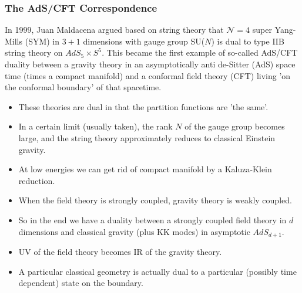 \documentclass[8pt,aspectratio=169]{beamer}
\begin{document}
\begin{frame}
\frametitle{The AdS/CFT Correspondence}

In 1999, Juan Maldacena argued based on string theory that $\mathcal{N}=4$ super Yang-Mills (SYM) in $3+1$ dimensions with gauge group SU($N$) is dual to type IIB string theory on $AdS_5\times S^5$. This became the first example of so-called AdS/CFT duality between a gravity theory in an asymptotically anti de-Sitter (AdS) space time (times a compact manifold) and a conformal field theory (CFT) living 'on the conformal boundary' of that spacetime. 

\begin{itemize}

\item These theories are dual in that the partition functions are 'the same'.

\item In a certain limit (usually taken), the rank $N$ of the gauge group becomes large, and the string theory approximately reduces to classical Einstein gravity.

\item At low energies we can get rid of compact manifold by a Kaluza-Klein reduction.

\item When the field theory is strongly coupled, gravity theory is weakly coupled.

\item So in the end we have a duality between a strongly coupled field theory in $d$ dimensions and classical gravity (plus KK modes) in asymptotic $AdS_{d+1}$.

\item UV of the field theory becomes IR of the gravity theory.

\item A particular classical geometry is actually dual to a particular (possibly time dependent) state on the boundary.

\end{itemize}

\end{frame}


\end{document}
